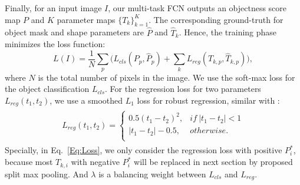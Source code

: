 Finally, for an input image $I$, our multi-task FCN outputs an objectness score map $P$ and $K$ parameter maps $\{T_k\}^K_{k=1}$. The corresponding ground-truth for object mask and shape parameters are $\hat{P}$ and $\hat{T}_{k}$. 
Hence, the training phase minimizes the loss function:
%
\begin{equation}\label{Eq:Loss}
L(I)=\frac{1}{N}\sum_p \Big ( L_{cls}(P_p,\hat{P}_{p}) + \sum_{k} L_{reg}(T_{k,p},\hat{T}_{k,p})\Big),
\end{equation}
where $N$ is the total number of pixels in the image.
We use the soft-max loss for the object classification $L_{cls}$.
For the regression loss for two parameters $L_{reg}(t_1,t_2)$, we use a smoothed $L_1$ loss for robust regression, similar with \cite{Ren2015}:
\begin{eqnarray}
\label{EqSmoothL1}
\begin{aligned}
L_{reg}(t_1,t_2) =\left\{\begin{array}{cl}
0.5(t_1-t_2)^2,&if~|t_1-t_2|<1\\
|t_1-t_2|-0.5,&otherwise.\\
\end{array}\right.
\end{aligned}
\end{eqnarray}
Specially, in Eq.~\ref{Eq:Loss}, we only consider the regression loss with positive $P^*_i$, because most $T_{k,i}$ with negative $P^*_i$ will be replaced in next section by proposed split max pooling.
And $\lambda$ is a balancing weight between $L_{cls}$ and $L_{reg}$.

